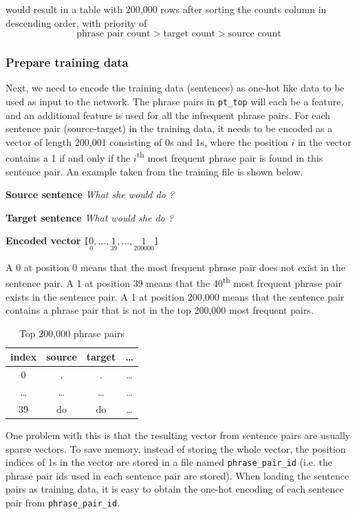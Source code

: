 \documentclass[12pt,a4paper,twoside,openright]{report}
\begin{document}
would result in a table with 200,000 rows after sorting the counts column in descending order, with priority of
\[\textrm{phrase pair count} > \textrm{target count} > \textrm{source count}\]

\subsubsection{Prepare training data}
Next, we need to encode the training data (sentences) as one-hot like data to be used as input to the network. The phrase pairs in \texttt{pt\_top} will each be a feature, and an additional feature is used for all the infrequent phrase pairs. For each sentence pair (source-target) in the training data, it needs to be encoded as a vector of length 200,001 consisting of 0s and 1s, where the position $i$ in the vector contains a 1 if and only if the $i$\textsuperscript{th} most frequent phrase pair is found in this sentence pair. An example taken from the training file is shown below.

\textbf{Source sentence}
\textit{What she would do ?}

\textbf{Target sentence}
\textit{What would she do ?}

\textbf{Encoded vector}
\texttt{[$\underset{0}{0}, \ldots, \underset{39}{1}, \ldots, \underset{200000}{1}$]}

A 0 at position 0 means that the most frequent phrase pair does not exist in the sentence pair. A 1 at position 39 means that the 40\textsuperscript{th} most frequent phrase pair exists in the sentence pair. A 1 at position 200,000 means that the sentence pair contains a phrase pair that is not in the top 200,000 most frequent pairs.

\begin{table}[ht]
\centering
\begin{tabular}{ |c|c|c|c| } 
 \hline
 index & source & target & \ldots \\ [0.5ex] 
 \hline
 0 & . & . & \ldots \\ 
 \ldots & \ldots & \ldots & \ldots \\ 
 39 & do & do & \ldots \\ 
 \hline
\end{tabular}
\caption{Top 200,000 phrase pairs}
\label{table:pt_top_exmaple}
\end{table}

One problem with this is that the resulting vector from sentence pairs are usually sparse vectors. To save memory, instead of storing the whole vector, the position indices of 1s in the vector are stored in a file named \texttt{phrase\_pair\_id} (i.e. the phrase pair ids used in each sentence pair are stored). When loading the sentence pairs as training data, it is easy to obtain the one-hot encoding of each sentence pair from \texttt{phrase\_pair\_id}.
\end{document}
